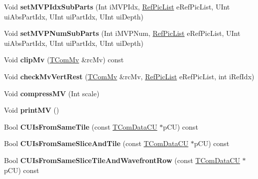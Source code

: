 \begin{DoxyCompactItemize}
Void {\bfseries set\+M\+V\+P\+Idx\+Sub\+Parts} (Int i\+M\+V\+P\+Idx, \hyperlink{_type_def_8h_a93cea48eb9dcfd661168dee82e41b384}{Ref\+Pic\+List} e\+Ref\+Pic\+List, U\+Int ui\+Abs\+Part\+Idx, U\+Int ui\+Part\+Idx, U\+Int ui\+Depth)
\item 
\mbox{\label{class_t_com_data_c_u_a63b6184524c7bd6d6a6d88c179aff582}} 
Void {\bfseries set\+M\+V\+P\+Num\+Sub\+Parts} (Int i\+M\+V\+P\+Num, \hyperlink{_type_def_8h_a93cea48eb9dcfd661168dee82e41b384}{Ref\+Pic\+List} e\+Ref\+Pic\+List, U\+Int ui\+Abs\+Part\+Idx, U\+Int ui\+Part\+Idx, U\+Int ui\+Depth)
\item 
\mbox{\label{class_t_com_data_c_u_a8ec5a2906cc6c5276548f47b314e0817}} 
Void {\bfseries clip\+Mv} (\hyperlink{class_t_com_mv}{T\+Com\+Mv} \&rc\+Mv) const
\item 
\mbox{\label{class_t_com_data_c_u_a7f227396c0270fc8c595fe2b0572a18a}} 
Void {\bfseries check\+Mv\+Vert\+Rest} (\hyperlink{class_t_com_mv}{T\+Com\+Mv} \&rc\+Mv, \hyperlink{_type_def_8h_a93cea48eb9dcfd661168dee82e41b384}{Ref\+Pic\+List} e\+Ref\+Pic\+List, int i\+Ref\+Idx)
\item 
\mbox{\label{class_t_com_data_c_u_a2b4e8d70c10104a4861153d69b5193c3}} 
Void {\bfseries compress\+MV} (Int scale)
\item 
\mbox{\label{class_t_com_data_c_u_aceb2ae68578cc58cfa2627af109ad477}} 
Void {\bfseries print\+MV} ()
\item 
\mbox{\label{class_t_com_data_c_u_accc642091172675998f505e49f087bdc}} 
Bool {\bfseries C\+U\+Is\+From\+Same\+Tile} (const \hyperlink{class_t_com_data_c_u}{T\+Com\+Data\+CU} $\ast$p\+CU) const
\item 
\mbox{\label{class_t_com_data_c_u_ac4fdd4618189e1bb56b810e2f5cc621f}} 
Bool {\bfseries C\+U\+Is\+From\+Same\+Slice\+And\+Tile} (const \hyperlink{class_t_com_data_c_u}{T\+Com\+Data\+CU} $\ast$p\+CU) const
\item 
\mbox{\label{class_t_com_data_c_u_abdde42e33d3a46c79a27deb997c831a2}} 
Bool {\bfseries C\+U\+Is\+From\+Same\+Slice\+Tile\+And\+Wavefront\+Row} (const \hyperlink{class_t_com_data_c_u}{T\+Com\+Data\+CU} $\ast$p\+CU) const

\end{DoxyCompactItemize}
